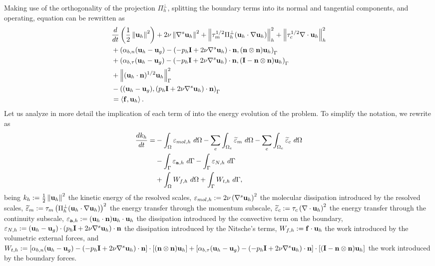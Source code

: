 Making use of the orthogonality of the projection $ \Pi_h^\perp $, splitting the boundary terms into its normal and tangential components, and operating, equation  can be rewritten as
\begin{align}
\label{eq-C7_NS_ene_balance_2}
&\frac{d}{dt}\left(\frac{1}{2}\left\|{\bf u}_h\right\|^2\right)+2\nu\left\|\nabla^s{\bf u}_h\right\|^2+\left\|\tau_m^{1/2}\Pi_h^\perp({\bf u}_h\cdot\nabla{\bf u}_h)\right\|^2_h+\left\|\tau_c^{1/2}\nabla\cdot{\bf u}_h\right\|^2_h\\\nonumber
&+\left(\alpha_{b,n}({\bf u}_h-{\bf u}_g)-(-p_h\mathbf{I}+2\nu\nabla^s{\bf u}_h)\cdot{\bf n},({\bf n}\otimes{\bf n}){\bf u}_h\right)_\Gamma\\\nonumber
&+\left(\alpha_{b,\tau}({\bf u}_h-{\bf u}_g)-(-p_h\mathbf{I}+2\nu\nabla^s{\bf u}_h)\cdot{\bf n},(\mathbf{I}-{\bf n}\otimes{\bf n}){\bf u}_h\right)_\Gamma\\\nonumber
&+\left\|({\bf u}_h\cdot{\bf n})^{1/2}{\bf u}_h\right\|^2_\Gamma\\\nonumber
&-\left(({\bf u}_h-{\bf u}_g),(p_h\mathbf{I}+2\nu\nabla^s{\bf u}_h)\cdot{\bf n}\right)_\Gamma\\\nonumber
&=\left\langle{\bf f},{\bf u}_h\right\rangle.
\end{align}
Let us analyze in more detail the implication of each term of  into the energy evolution of the problem. To simplify the notation, we rewrite  as
\begin{align}
\label{eq-C7_NS_ene_balance_3}
\frac{dk_h}{dt}=&-\int_{\Omega}\varepsilon_{mol,h}\ d\Omega-\sum_e\int_{\Omega_e}\widetilde{\varepsilon}_m\ d\Omega-\sum_e\int_{\Omega_e}\widetilde{\varepsilon}_c\ d\Omega\\\nonumber
&-\int_{\Gamma}\varepsilon_{\a,h}\ d\Gamma-\int_{\Gamma}\varepsilon_{N,h}\ d\Gamma\\\nonumber
&+\int_{\Omega}W_{f,h}\ d\Omega+\int_{\Gamma}W_{t,h}\ d\Gamma,
\end{align}
being $ k_h:=\frac{1}{2}\left\|{\bf u}_h\right\|^2 $ the kinetic energy of the resolved scales, $ \varepsilon_{mol,h}:=2\nu\left(\nabla^s{\bf u}_h\right)^2 $ the molecular dissipation introduced by the resolved scales, $ \widetilde{\varepsilon}_m:=\tau_m\left(\Pi_h^\perp({\bf u}_h\cdot\nabla{\bf u}_h)\right)^2 $ the energy transfer through the momentum subscale, $ \widetilde{\varepsilon}_c:=\tau_c\left(\nabla\cdot{\bf u}_h\right)^2 $ the energy transfer through the continuity subscale, $ \varepsilon_{{\bf a},h}:=({\bf u}_h\cdot{\bf n}){\bf u}_h\cdot{\bf u}_h $ the dissipation introduced by the convective term on the boundary, $ \varepsilon_{N,h}:=({\bf u}_h-{\bf u}_g)\cdot(p_h\mathbf{I}+2\nu\nabla^s{\bf u}_h)\cdot{\bf n} $ the dissipation introduced by the Nitsche's terms, $ W_{f,h}:={\bf f}\cdot{\bf u}_h $ the work introduced by the volumetric external forces, and $ W_{t,h}:=\left[\alpha_{b,n}({\bf u}_h-{\bf u}_g)-(-p_h\mathbf{I}+2\nu\nabla^s{\bf u}_h)\cdot{\bf n}\right]\cdot\left[({\bf n}\otimes{\bf n}){\bf u}_h\right]+\left[\alpha_{b,\tau}({\bf u}_h-{\bf u}_g)-(-p_h\mathbf{I}+2\nu\nabla^s{\bf u}_h)\cdot{\bf n}\right]\cdot\left[(\mathbf{I}-{\bf n}\otimes{\bf n}){\bf u}_h\right] $ the work introduced by the boundary forces.

